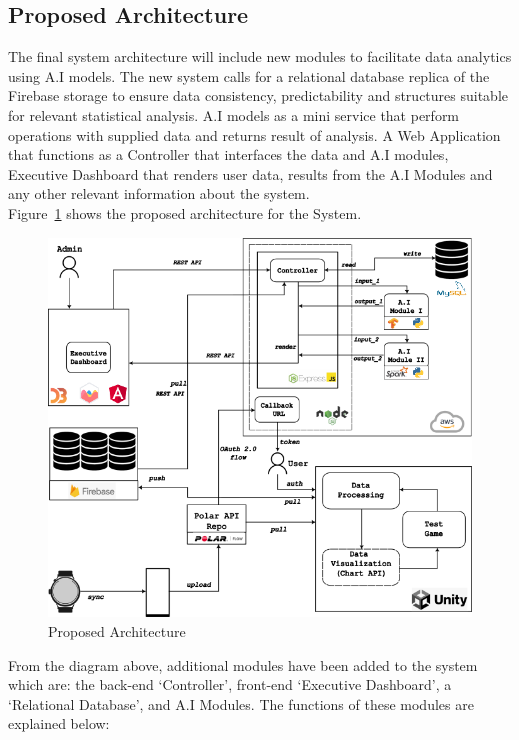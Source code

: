 \documentclass{report}
\begin{document}
    \subsection*{Proposed Architecture}
    The final system architecture will include new modules to facilitate data analytics using A.I models. The new system calls 
    for a relational database replica of the Firebase storage to ensure data consistency, predictability and structures suitable
    for relevant statistical analysis. A.I models as a mini service that perform operations with supplied data and returns result
    of analysis. A Web Application that functions as a Controller that interfaces the data and A.I modules, Executive Dashboard 
    that renders user data, results from the A.I Modules and any other relevant information about the system.\\
    Figure~\ref{fig:proposed-web-architecture} shows the proposed architecture for the System.
    \begin{figure}[h]
        \includegraphics[scale=0.675]{images/proposed-architecture.png}
        \caption{Proposed Architecture}
        \label{fig:proposed-web-architecture}
    \end{figure}
    From the diagram above, additional modules have been added to the system which are: the back-end `Controller', front-end 
    `Executive Dashboard', a `Relational Database', and A.I Modules. The functions of these modules are explained below:
\end{document}
